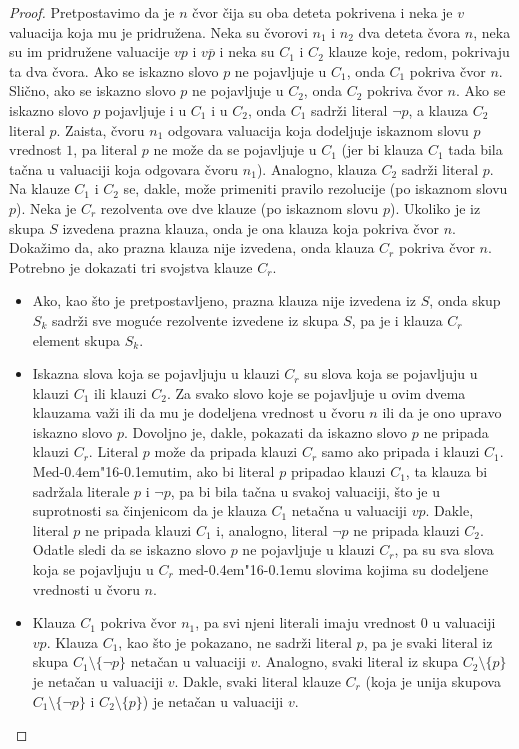 \documentclass[12pt, a4paper, titlepage, twoside]{article}
\theoremstyle{definition}
\def\dj{d\kern-0.4em\char"16\kern-0.1em}
\begin{document}
\vspace{0.2cm}
\begin{proof}
Pretpostavimo da je $n$ \v cvor \v cija su oba deteta pokrivena i neka je $v$ valuacija
koja mu je pridru\v zena. Neka su \v cvorovi $n_1$ i $n_2$ dva deteta \v cvora $n$,
neka su im pridru\v zene valuacije $vp$ i $v\overline{p}$ i neka su $C_1$ i $C_2$ klauze koje,
redom, pokrivaju ta dva \v cvora. Ako se iskazno slovo $p$ ne pojavljuje u
$C_1$, onda $C_1$ pokriva \v cvor $n$. Sli\v cno, ako se iskazno slovo $p$ ne pojavljuje
u $C_2$, onda $C_2$ pokriva \v cvor $n$. Ako se iskazno slovo $p$ pojavljuje i u $C_1$
i u $C_2$, onda $C_1$ sadr\v zi literal $\neg p$, a klauza $C_2$ literal $p$. Zaista, \v cvoru 
$n_1$ odgovara valuacija koja dodeljuje iskaznom slovu $p$ vrednost $1$, pa literal
$p$ ne mo\v ze da se pojavljuje u $C_1$ (jer bi klauza $C_1$ tada bila ta\v cna u valuaciji
koja odgovara \v cvoru $n_1$). Analogno, klauza $C_2$ sadr\v zi literal $p$. Na klauze
$C_1$ i $C_2$ se, dakle, mo\v ze primeniti pravilo rezolucije (po iskaznom slovu
$p$). Neka je $C_r$ rezolventa ove dve klauze (po iskaznom slovu $p$). Ukoliko je iz skupa $S$ 
izvedena prazna klauza, onda je ona klauza koja
pokriva \v cvor $n$. Doka\v zimo da, ako prazna klauza nije izvedena, onda
klauza $C_r$ pokriva \v cvor $n$. Potrebno je dokazati tri svojstva klauze $C_r$.
\begin{itemize}
	\item Ako, kao \v sto je pretpostavljeno, prazna klauza nije izvedena iz $S$,
onda skup $S_k$ sadr\v zi sve mogu\'ce rezolvente izvedene iz skupa $S$, pa
je i klauza $C_r$ element skupa $S_k$.
	\item Iskazna slova koja se pojavljuju u klauzi $C_r$ su slova koja se pojavljuju
u klauzi $C_1$ ili klauzi $C_2$. Za svako slovo koje se pojavljuje u
ovim dvema klauzama va\v zi ili da mu je dodeljena vrednost u \v cvoru
$n$ ili da je ono upravo iskazno slovo $p$. Dovoljno je, dakle, pokazati
da iskazno slovo $p$ ne pripada klauzi $C_r$. Literal $p$ mo\v ze da pripada
klauzi $C_r$ samo ako pripada i klauzi $C_1$. Me\dj{}utim, ako bi literal
$p$ pripadao klauzi $C_1$, ta klauza bi sadr\v zala literale $p$ i $\neg p$, pa bi
bila ta\v cna u svakoj valuaciji, \v sto je u suprotnosti sa \v cinjenicom da
je klauza $C_1$ neta\v cna u valuaciji $vp$. Dakle, literal $p$ ne pripada klauzi
$C_1$ i, analogno, literal $\neg p$ ne pripada klauzi $C_2$. Odatle sledi da se
iskazno slovo $p$ ne pojavljuje u klauzi $C_r$, pa su sva slova koja se pojavljuju
u $C_r$ me\dj{}u slovima kojima su dodeljene vrednosti u \v cvoru
$n$.
	\item Klauza $C_1$ pokriva \v cvor $n_1$, pa svi njeni literali imaju vrednost $0$ u
valuaciji $vp$. Klauza $C_1$, kao \v sto je pokazano, ne sadr\v zi literal $p$, pa
je svaki literal iz skupa $C_1 \setminus \{\neg p\}$ neta\v can u valuaciji $v$. Analogno,
svaki literal iz skupa $C_2 \setminus \{p\}$ je neta\v can u valuaciji $v$. Dakle, svaki
literal klauze $C_r$ (koja je unija skupova $C_1 \setminus \{\neg p\}$ i $C_2 \setminus \{p\}$) 
je neta\v can u valuaciji $v$.
\end{itemize} \end{proof}
\end{document}
